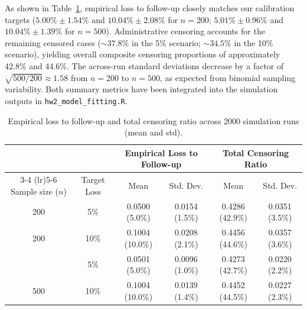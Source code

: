 \documentclass[10pt,a4paper]{article}
\begin{document}
As shown in Table~\ref{tab:censoring}, empirical loss to follow-up closely matches our calibration targets ($5.00\% \pm 1.54\%$ and $10.04\% \pm 2.08\%$ for $n=200$; $5.01\% \pm 0.96\%$ and $10.04\% \pm 1.39\%$ for $n=500$). Administrative censoring accounts for the remaining censored cases ($\sim 37.8\%$ in the 5\% scenario; $\sim 34.5\%$ in the 10\% scenario), yielding overall composite censoring proportions of approximately 42.8\% and 44.6\%. The across-run standard deviations decrease by a factor of $\sqrt{500/200}\approx 1.58$ from $n=200$ to $n=500$, as expected from binomial sampling variability. Both summary metrics have been integrated into the simulation outputs in \texttt{hw2\_model\_fitting.R}.

\begin{table}[H]
\centering\footnotesize
\caption{Empirical loss to follow-up and total censoring ratio across 2000 simulation runs (mean and std).}\label{tab:censoring}
\begin{tabular}{@{}cccccc@{}}
\toprule
& & \multicolumn{2}{c}{Empirical Loss to Follow-up} & \multicolumn{2}{c}{Total Censoring Ratio} \\
\cmidrule(lr){3-4} \cmidrule(lr){5-6}
Sample size ($n$) & Target Loss & Mean & Std. Dev. & Mean & Std. Dev. \\
\midrule
200 & 5\%  & 0.0500 (5.0\%)  & 0.0154 (1.5\%) & 0.4286 (42.9\%) & 0.0351 (3.5\%) \\
200 & 10\% & 0.1004 (10.0\%) & 0.0208 (2.1\%) & 0.4456 (44.6\%) & 0.0357 (3.6\%) \\
\addlinespace
500 & 5\%  & 0.0501 (5.0\%)  & 0.0096 (1.0\%) & 0.4273 (42.7\%) & 0.0220 (2.2\%) \\
500 & 10\% & 0.1004 (10.0\%) & 0.0139 (1.4\%) & 0.4452 (44.5\%) & 0.0227 (2.3\%) \\
\bottomrule
\end{tabular}
\end{table}
\vspace{-6pt}
\end{document}

